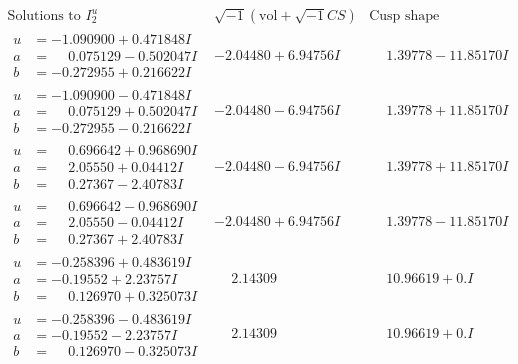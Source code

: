 \documentclass[1p]{elsarticle_modified}
\theoremstyle{definition}
\newcommand{\I}{\sqrt{-1}}
\begin{document}
$$\begin{array}{c|c|c}  
\text{Solutions to }I^u_{2}& \I (\text{vol} + \sqrt{-1}CS) & \text{Cusp shape}\\
 \hline 
\begin{aligned}
u &= -1.090900 + 0.471848 I \\
a &= \phantom{-}0.075129 - 0.502047 I \\
b &= -0.272955 + 0.216622 I\end{aligned}
 & -2.04480 + 6.94756 I & \phantom{-}1.39778 - 11.85170 I \\ \hline\begin{aligned}
u &= -1.090900 - 0.471848 I \\
a &= \phantom{-}0.075129 + 0.502047 I \\
b &= -0.272955 - 0.216622 I\end{aligned}
 & -2.04480 - 6.94756 I & \phantom{-}1.39778 + 11.85170 I \\ \hline\begin{aligned}
u &= \phantom{-}0.696642 + 0.968690 I \\
a &= \phantom{-}2.05550 + 0.04412 I \\
b &= \phantom{-}0.27367 - 2.40783 I\end{aligned}
 & -2.04480 - 6.94756 I & \phantom{-}1.39778 + 11.85170 I \\ \hline\begin{aligned}
u &= \phantom{-}0.696642 - 0.968690 I \\
a &= \phantom{-}2.05550 - 0.04412 I \\
b &= \phantom{-}0.27367 + 2.40783 I\end{aligned}
 & -2.04480 + 6.94756 I & \phantom{-}1.39778 - 11.85170 I \\ \hline\begin{aligned}
u &= -0.258396 + 0.483619 I \\
a &= -0.19552 + 2.23757 I \\
b &= \phantom{-}0.126970 + 0.325073 I\end{aligned}
 & \phantom{-}2.14309\phantom{ +0.000000I} & \phantom{-}10.96619 + 0. I\phantom{ +0.000000I} \\ \hline\begin{aligned}
u &= -0.258396 - 0.483619 I \\
a &= -0.19552 - 2.23757 I \\
b &= \phantom{-}0.126970 - 0.325073 I\end{aligned}
 & \phantom{-}2.14309\phantom{ +0.000000I} & \phantom{-}10.96619 + 0. I\phantom{ +0.000000I} \\ \hline\begin{aligned}

\end{aligned}
\end{array}$$
\end{document}

